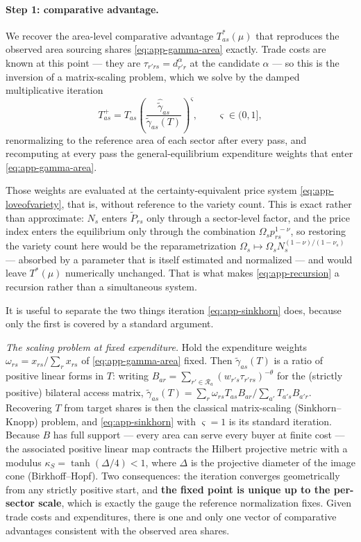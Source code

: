 \paragraph{Step 1: comparative advantage.} We recover the area-level comparative advantage
$T^{*}_{as}(\mu)$ that reproduces the observed area sourcing shares \eqref{eq:app-gamma-area}
exactly. Trade costs are known at this point --- they are $\tau_{r'rs}=d_{r'r}^{\alpha}$ at the
candidate $\alpha$ --- so this is the inversion of a matrix-scaling problem, which we solve by
the damped multiplicative iteration
\begin{equation}
T^{+}_{as}=T_{as}\left(\frac{\hat{\tilde\gamma}_{as}}{\tilde\gamma_{as}(T)}\right)^{\varsigma},
\qquad \varsigma\in(0,1],
\label{eq:app-sinkhorn}
\end{equation}
renormalizing to the reference area of each sector after every pass, and recomputing at every
pass the general-equilibrium expenditure weights that enter \eqref{eq:app-gamma-area}.

Those weights are evaluated at the certainty-equivalent price system
\eqref{eq:app-loveofvariety}, that is, without reference to the variety count. This is exact
rather than approximate: $N_{s}$ enters $\widetilde P_{rs}$ only through a sector-level factor,
and the price index enters the equilibrium only through the combination
$\Omega_{s}p_{rs}^{1-\nu}$, so restoring the variety count here would be the reparametrization
$\Omega_{s}\mapsto\Omega_{s}N_{s}^{(1-\nu)/(1-\nu_{s})}$ --- absorbed by a parameter that is
itself estimated and normalized --- and would leave $T^{*}(\mu)$ numerically unchanged. That is
what makes \eqref{eq:app-recursion} a recursion rather than a simultaneous system.

It is useful to separate the two things iteration \eqref{eq:app-sinkhorn} does, because only the
first is covered by a standard argument.

\emph{The scaling problem at fixed expenditure.} Hold the expenditure weights
$\omega_{rs}=x_{rs}/\sum_{r}x_{rs}$ of \eqref{eq:app-gamma-area} fixed. Then
$\tilde\gamma_{as}(T)$ is a ratio of positive linear forms in $T$: writing
$B_{ar}=\sum_{r'\in\mathcal{R}_{a}}(w_{r's}\tau_{r'rs})^{-\theta}$ for the (strictly positive)
bilateral access matrix, $\tilde\gamma_{as}(T)=\sum_{r}\omega_{rs}T_{as}B_{ar}/\sum_{a'}T_{a's}B_{a'r}$.
Recovering $T$ from target shares is then the classical matrix-scaling (Sinkhorn--Knopp) problem,
and \eqref{eq:app-sinkhorn} with $\varsigma=1$ is its standard iteration. Because $B$ has full
support --- every area can serve every buyer at finite cost --- the associated positive linear
map contracts the Hilbert projective metric with a modulus $\kappa_{S}=\tanh(\Delta/4)<1$, where
$\Delta$ is the projective diameter of the image cone (Birkhoff--Hopf). Two consequences: the
iteration converges geometrically from any strictly positive start, and \textbf{the fixed point
is unique up to the per-sector scale}, which is exactly the gauge the reference normalization
fixes. Given trade costs and expenditures, there is one and only one vector of comparative
advantages consistent with the observed area shares.

